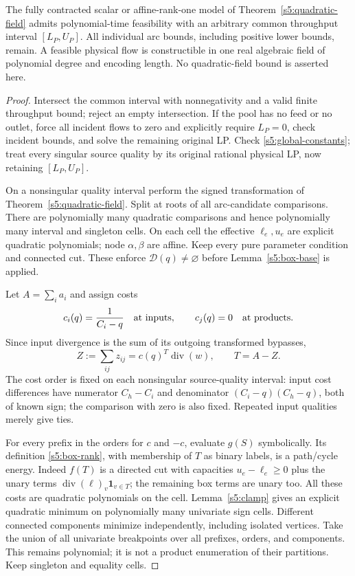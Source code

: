 \begin{theorem}
\label{s5:restrictive-capacity}
The fully contracted scalar or affine-rank-one model of
Theorem~\ref{s5:quadratic-field} admits polynomial-time feasibility with
an arbitrary common throughput interval $[L_P,U_P]$. All individual
arc bounds, including positive lower bounds, remain. A feasible physical
flow is constructible in one real algebraic field of polynomial degree
and encoding length. No quadratic-field bound is asserted here.
\end{theorem}
\begin{proof}
Intersect the common interval with nonnegativity and a valid finite
throughput bound; reject an empty intersection. If the pool has no feed
or no outlet, force all incident flows to zero and explicitly require
$L_P=0$, check incident bounds, and solve the remaining original LP.
Check \eqref{s5:global-constants}; treat every singular source quality
by its original rational physical LP, now retaining $[L_P,U_P]$.

On a nonsingular quality interval perform the signed transformation
of Theorem~\ref{s5:quadratic-field}. Split at roots of all arc-candidate
comparisons. There are polynomially many quadratic comparisons and
hence polynomially many interval and singleton cells. On each cell the
effective $\ell_e,u_e$ are explicit quadratic polynomials; node
$\alpha,\beta$ are affine. Keep every pure parameter condition and
connected cut. These enforce $\mathcal D(q)\ne\varnothing$ before
Lemma~\ref{s5:box-base} is applied.

Let $A=\sum_i a_i$ and assign costs
\[
 c_i(q)=\frac1{C_i-q}\quad\hbox{at inputs},\qquad
 c_j(q)=0\quad\hbox{at products}.
\]
Since input divergence is the sum of its outgoing transformed bypasses,
\begin{equation}
 Z:=\sum_{ij}z_{ij}=c(q)^T\operatorname{div}(w),\qquad T=A-Z.
 \label{s5:throughput-support}
\end{equation}
The cost order is fixed on each nonsingular source-quality interval:
input cost differences have numerator $C_h-C_i$ and denominator
$(C_i-q)(C_h-q)$, both of known sign; the comparison with zero is
also fixed. Repeated input qualities merely give ties.

For every prefix in the orders for $c$ and $-c$, evaluate $g(S)$
symbolically. Its definition \eqref{s5:box-rank}, with membership of
$T$ as binary labels, is a path/cycle energy. Indeed $f(T)$ is a directed
cut with capacities $u_e-\ell_e\ge0$ plus the unary terms
$\operatorname{div}(\ell)_v\mathbf1_{v\in T}$; the remaining box
terms are unary too. All these costs are quadratic polynomials on the
cell. Lemma~\ref{s5:clamp} gives an explicit quadratic minimum on
polynomially many univariate sign cells. Different connected components
minimize independently, including isolated vertices. Take the union
of all univariate breakpoints over all prefixes, orders, and components.
This remains polynomial; it is not a product enumeration of their
partitions. Keep singleton and equality cells.


\end{proof}
